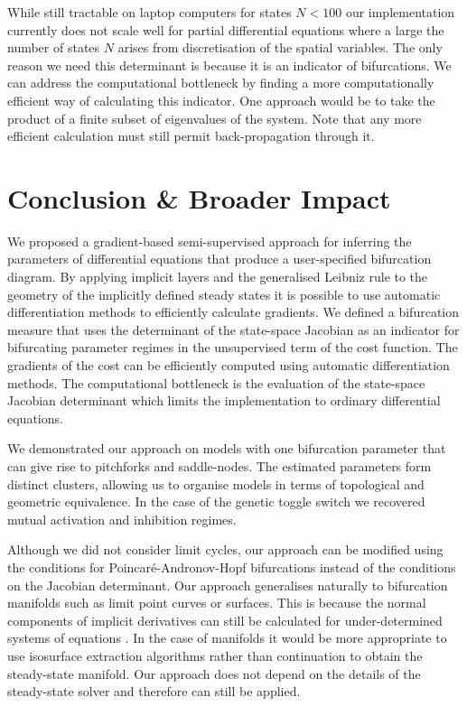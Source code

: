 \documentclass{article}
\begin{document}
While still tractable on laptop computers for states $N<100$ our implementation currently does not scale well for partial differential equations where a large the number of states $N$ arises from discretisation of the spatial variables. The only reason we need this determinant is because it is an indicator of bifurcations. We can address the computational bottleneck by finding a more computationally efficient way of calculating this indicator. One approach would be to take the product of a finite subset of eigenvalues of the system. Note that any more efficient calculation must still permit back-propagation through it.

\section{Conclusion \& Broader Impact}
\label{section:conclusion}

We proposed a gradient-based semi-supervised approach for inferring the parameters of differential equations that produce a user-specified bifurcation diagram. By applying implicit layers \cite{Look2020DifferentiableLayers,Bai2019DeepModels} and the generalised Leibniz rule \cite{Flanders1973DifferentiationSign} to the geometry of the implicitly defined steady states \cite{Goldman2005CurvatureSurfaces} it is possible to use automatic differentiation methods to efficiently calculate gradients. We defined a bifurcation measure that uses the determinant of the state-space Jacobian as an indicator for bifurcating parameter regimes in the unsupervised term of the cost function. The gradients of the cost can be efficiently computed using automatic differentiation methods. The computational bottleneck is the evaluation of the state-space Jacobian determinant which limits the implementation to ordinary differential equations.

We demonstrated our approach on models with one bifurcation parameter that can give rise to pitchforks and saddle-nodes. The estimated parameters form distinct clusters, allowing us to organise models in terms of topological and geometric equivalence. In the case of the genetic toggle switch we recovered mutual activation and inhibition regimes.

Although we did not consider limit cycles, our approach can be modified using the conditions for Poincar\'e-Andronov-Hopf bifurcations instead of the conditions on the Jacobian determinant. Our approach generalises naturally to bifurcation manifolds such as limit point curves or surfaces. This is because the normal components of implicit derivatives can still be calculated for under-determined systems of equations \cite{Jos2011OnSurface,Tao2016Near-IsometricTracking,Fujisawa2013CalculationInvariance}. In the case of manifolds it would be more appropriate to use isosurface extraction algorithms rather than continuation to obtain the steady-state manifold. Our approach does not depend on the details of the steady-state solver and therefore can still be applied.
\end{document}
